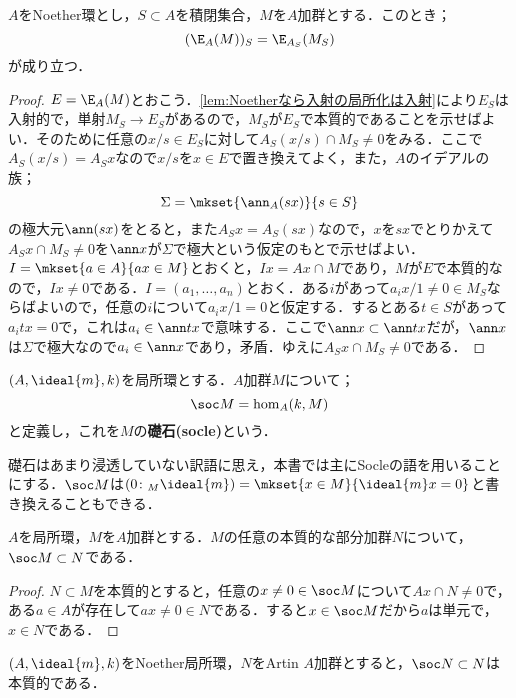 \begin{lem}\label{lem:入射包絡は局所化と可換}
	$A$をNoether環とし，$S\subset A$を積閉集合，$M$を$A$加群とする．このとき；
	\[(\E_A(M))_S=\E_{A_S}(M_S)\]
	が成り立つ．
\end{lem}
\begin{proof}
	$E=\E_A(M)$とおこう．\ref{lem:Noetherなら入射の局所化は入射}により$E_S$は入射的で，単射$M_S\to E_S$があるので，$M_S$が$E_S$で本質的であることを示せばよい．そのために任意の$x/s\in E_S$に対して$A_S(x/s)\cap M_S\neq 0$をみる．ここで$A_S(x/s)=A_S x$なので$x/s$を$x\in E$で置き換えてよく，また，$A$のイデアルの族；
	\[\Sigma=\mkset{\ann_A(sx)}{s\in S}\]
	の極大元$\ann(sx)$をとると，また$A_Sx=A_S(sx)$なので，$x$を$sx$でとりかえて$A_S x\cap M_S\neq0$を$\ann x$が$\Sigma$で極大という仮定のもとで示せばよい．$I=\mkset{a\in A}{ax\in M}$とおくと，$Ix=Ax\cap M$であり，$M$が$E$で本質的なので，$Ix\neq 0$である．$I=(a_1,\dots,a_n)$とおく．ある$i$があって$a_ix/1\neq 0\in M_S$ならばよいので，任意の$i$について$a_ix/1=0$と仮定する．するとある$t\in S$があって$a_i tx=0$で，これは$a_i \in\ann tx$で意味する．ここで$\ann x\subset\ann tx$だが，$\ann x$は$\Sigma$で極大なので$a_i\in\ann x$であり，矛盾．ゆえに$A_Sx\cap M_S\neq 0$である．
\end{proof}

\begin{defi}[礎石]
	$(A,\ideal{m},k)$を局所環とする．$A$加群$M$について；
	\[\soc M=\hom_A(k,M)\]
	と定義し，これを$M$の\textbf{礎石(socle)}という．
\end{defi}

礎石はあまり浸透していない訳語に思え，本書では主にSocleの語を用いることにする．$\soc M$は$(0\colon_M\ideal{m})=\mkset{x\in M}{\ideal{m}x=0}$と書き換えることもできる．

\begin{lem}
	$A$を局所環，$M$を$A$加群とする．$M$の任意の本質的な部分加群$N$について，$\soc M\subset N$である．
\end{lem}

\begin{proof}
	$N\subset M$を本質的とすると，任意の$x\neq 0\in\soc M$について$Ax\cap N\neq 0$で，ある$a\in A$が存在して$ax\neq 0\in N$である．すると$x\in\soc M$だから$a$は単元で，$x\in N$である．
\end{proof}

\begin{prop}\label{prop:ArtinのSocleはessential}
	$(A,\ideal{m},k)$をNoether局所環，$N$をArtin $A$加群とすると，$\soc N\subset N$は本質的である．
\end{prop}

